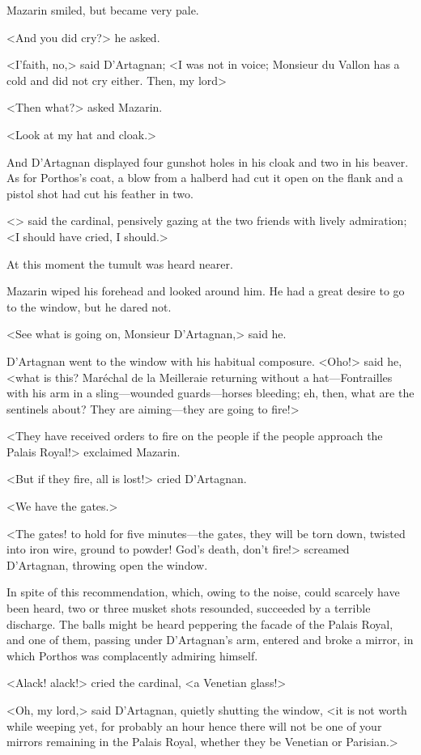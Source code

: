 Mazarin smiled, but became very pale.

<And you did cry?> he asked.

<I'faith, no,> said D'Artagnan; <I was not in voice; Monsieur du Vallon has a cold and did not cry either. Then, my lord\longdash>

<Then what?> asked Mazarin.

<Look at my hat and cloak.>

And D'Artagnan displayed four gunshot holes in his cloak and two in his beaver. As for Porthos's coat, a blow from a halberd had cut it open on the flank and a pistol shot had cut his feather in two.

<> said the cardinal, pensively gazing at the two friends with lively admiration; <I should have cried, I should.>

At this moment the tumult was heard nearer.

Mazarin wiped his forehead and looked around him. He had a great desire to go to the window, but he dared not.

<See what is going on, Monsieur D'Artagnan,> said he.

D'Artagnan went to the window with his habitual composure. <Oho!> said he, <what is this? Maréchal de la Meilleraie returning without a hat—Fontrailles with his arm in a sling—wounded guards—horses bleeding; eh, then, what are the sentinels about? They are aiming—they are going to fire!>

<They have received orders to fire on the people if the people approach the Palais Royal!> exclaimed Mazarin.

<But if they fire, all is lost!> cried D'Artagnan.

<We have the gates.>

<The gates! to hold for five minutes—the gates, they will be torn down, twisted into iron wire, ground to powder! God's death, don't fire!> screamed D'Artagnan, throwing open the window.

In spite of this recommendation, which, owing to the noise, could scarcely have been heard, two or three musket shots resounded, succeeded by a terrible discharge. The balls might be heard peppering the facade of the Palais Royal, and one of them, passing under D'Artagnan's arm, entered and broke a mirror, in which Porthos was complacently admiring himself.

<Alack! alack!> cried the cardinal, <a Venetian glass!>

<Oh, my lord,> said D'Artagnan, quietly shutting the window, <it is not worth while weeping yet, for probably an hour hence there will not be one of your mirrors remaining in the Palais Royal, whether they be Venetian or Parisian.>

